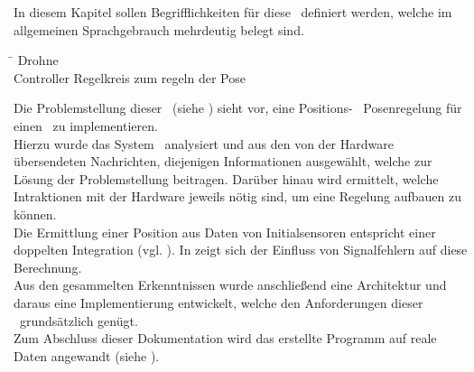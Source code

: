 
In diesem Kapitel sollen Begrifflichkeiten für diese \Arbeit\ definiert werden, welche im allgemeinen Sprachgebrauch mehrdeutig belegt sind.

\begin{tabbing}
\hspace{5cm} \= \kill
Drohne \> \Quad\\
Controller \> Regelkreis zum regeln der Pose
\end{tabbing}


Die Problemstellung dieser \Arbeit\ (siehe ) sieht vor, eine Positions- \bzw\ Posenregelung für einen \Quad\ zu implementieren.\\
Hierzu wurde das System \Quad\ analysiert und aus den von der Hardware übersendeten Nachrichten, diejenigen Informationen ausgewählt, welche zur Lösung der Problemstellung beitragen. Darüber hinau wird ermittelt, welche Intraktionen mit der Hardware jeweils nötig sind, um eine Regelung aufbauen zu können.\\
Die Ermittlung einer Position aus Daten von Initialsensoren entspricht einer doppelten Integration (vgl. ). In  zeigt sich der Einfluss von Signalfehlern auf diese Berechnung.\\
Aus den gesammelten Erkenntnissen wurde anschließend eine Architektur und daraus eine Implementierung entwickelt, welche den Anforderungen dieser \Arbeit\ grundsätzlich genügt.\\
Zum Abschluss dieser Dokumentation wird das erstellte Programm auf reale Daten angewandt (siehe ).
